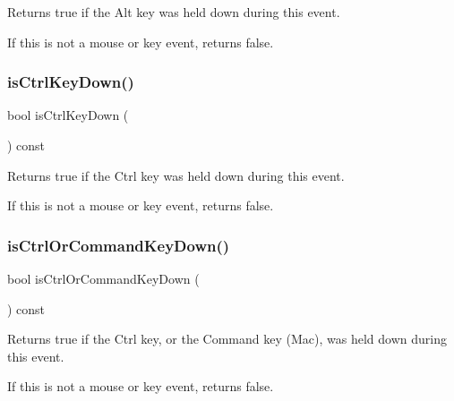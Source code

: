 Returns {\ttfamily true} if the Alt key was held down during this event. 

If this is not a mouse or key event, returns false. \mbox{\label{classsgl_1_1GEvent_a32ebd8661e615f5fbe15322b3423e06c}} 
\subsubsection{\texorpdfstring{is\+Ctrl\+Key\+Down()}{isCtrlKeyDown()}}
{\footnotesize\ttfamily bool is\+Ctrl\+Key\+Down (\begin{DoxyParamCaption}{ }\end{DoxyParamCaption}) const\hspace{0.3cm}{\ttfamily [virtual]}}



Returns {\ttfamily true} if the Ctrl key was held down during this event. 

If this is not a mouse or key event, returns false. \mbox{\label{classsgl_1_1GEvent_a96b51557188c36392073bf1a5f92d610}} 
\subsubsection{\texorpdfstring{is\+Ctrl\+Or\+Command\+Key\+Down()}{isCtrlOrCommandKeyDown()}}
{\footnotesize\ttfamily bool is\+Ctrl\+Or\+Command\+Key\+Down (\begin{DoxyParamCaption}{ }\end{DoxyParamCaption}) const\hspace{0.3cm}{\ttfamily [virtual]}}



Returns {\ttfamily true} if the Ctrl key, or the Command key (Mac), was held down during this event. 

If this is not a mouse or key event, returns false. \mbox{\label{classsgl_1_1GEvent_a40b4e808443ad49df2a79a6b1011be7a}} 

